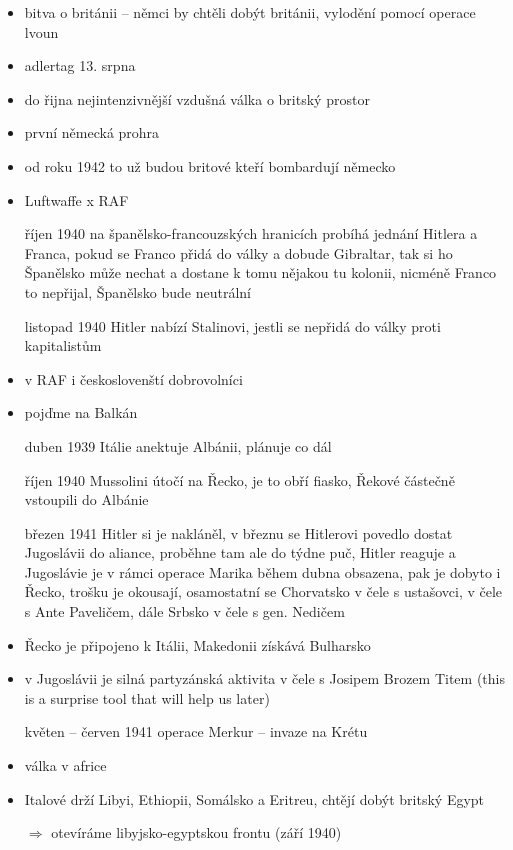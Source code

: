 \documentclass{article}
\title{\vspace{-2cm}\vspace{-1.7cm}}
\date{}
\author{}
\begin{document}
\maketitle
\begin{itemize}
  \item bitva o británii -- němci by chtěli dobýt británii, vylodění pomocí operace lvoun
  \item adlertag 13. srpna
  \item do řijna nejintenzivnější vzdušná válka o britský prostor
  \item první německá prohra
  \item od roku 1942 to už budou britové kteří bombardují německo
  \item Luftwaffe x RAF
  \item[říjen 1940] na španělsko-francouzských hranicích probíhá jednání Hitlera a Franca, pokud se Franco přidá do války a dobude Gibraltar, tak si ho Španělsko může nechat a dostane k tomu nějakou tu kolonii, nicméně Franco to nepřijal, Španělsko bude neutrální
  \item[listopad 1940] Hitler nabízí Stalinovi, jestli se nepřidá do války proti kapitalistům
  \item v RAF i českoslovenští dobrovolníci
  \item pojďme na Balkán
  \item[duben 1939] Itálie anektuje Albánii, plánuje co dál
  \item[říjen 1940] Mussolini útočí na Řecko, je to obří fiasko, Řekové částečně vstoupili do Albánie
  \item[březen 1941] Hitler si je nakláněl, v březnu se Hitlerovi povedlo dostat Jugoslávii do aliance, proběhne tam ale do týdne puč, Hitler reaguje a Jugoslávie je v rámci operace Marika během dubna obsazena, pak je dobyto i Řecko, trošku je okousají, osamostatní se Chorvatsko v čele s ustašovci, v čele s Ante Paveličem, dále Srbsko v čele s gen. Nedičem
  \item Řecko je připojeno k Itálii, Makedonii získává Bulharsko
  \item v Jugoslávii je silná partyzánská aktivita v čele s Josipem Brozem Titem (this is a surprise tool that will help us later)
  \item[květen -- červen 1941] operace Merkur -- invaze na Krétu
  \item válka v africe
  \item Italové drží Libyi, Ethiopii, Somálsko a Eritreu, chtějí dobýt britský Egypt
  \item[$\Rightarrow$] otevíráme libyjsko-egyptskou frontu (září 1940)

\end{itemize}
\end{document}
